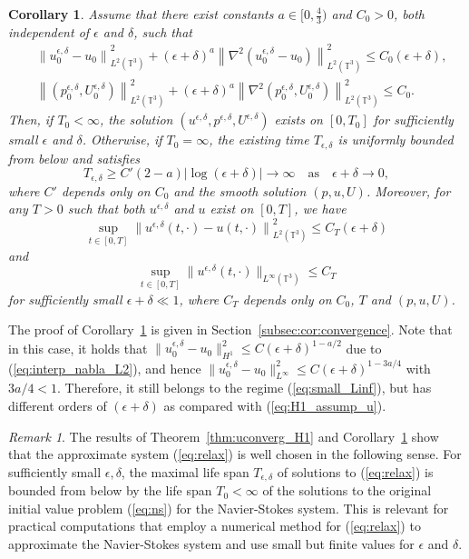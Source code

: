 \documentclass[reqno,10pt]{amsart}
\newtheorem{corollary}[theorem]{Corollary}
\theoremstyle{definition}
\theoremstyle{remark}
\newtheorem{remark}[theorem]{Remark}
\numberwithin{equation}{section}
\begin{document}
\begin{corollary} \label{cor:convergence}    
Assume that there exist constants $a \in [0,\frac{4}{3})$ and $C_0>0$, both independent of $\epsilon$ and $\delta$, such that
    \begin{subequations}
    \begin{align}
        &{\| u_0^{\epsilon,\delta}-u_0\|}_{L^2(\mathbb T^3)}^2 + (\epsilon+\delta)^a \left\|\nabla^2 \left(u_0^{\epsilon,\delta}-u_0\right)\right\|_{L^2(\mathbb T^3)}^2 \le C_0(\epsilon+\delta), \\
        &\left\| \left(p_0^{\epsilon,\delta},U_0^{\epsilon,\delta}\right) \right\|_{L^2(\mathbb T^3)}^2 + (\epsilon+\delta)^a \left\| \nabla^2\left(p_0^{\epsilon,\delta},U_0^{\epsilon,\delta}\right) \right\|_{L^2(\mathbb T^3)}^2 \le C_0.
    \end{align}
    \end{subequations}
    Then, if $T_0<\infty$, the solution $(u^{\epsilon,\delta},p^{\epsilon,\delta},U^{\epsilon,\delta})$ exists on $[0,T_0]$ for sufficiently small $\epsilon$ and $\delta$. Otherwise, if $T_0=\infty$, the existing time $T_{\epsilon,\delta}$ is uniformly bounded from below and satisfies
    \[
        T_{\epsilon,\delta} \ge C' (2-a) |\log(\epsilon+\delta)| \to \infty \quad \text{as} 
        \quad \epsilon+\delta\to 0,
    \]
    where $C'$ depends only on $C_0$ and the smooth solution $(p,u,U)$.
    Moreover, for any $T>0$ such that both $u^{\epsilon,\delta}$ and $u$ exist on $[0,T]$, we have
    \[
        \sup_{t\in[0,T]} {\| u^{\epsilon,\delta}(t,\cdot)-u(t,\cdot)\|}_{L^2(\mathbb T^3)}^2 \le C_T(\epsilon+\delta)
    \]
    and
    \[
       \sup_{t\in[0,T]} \| u^{\epsilon,\delta}(t,\cdot)\|_{L^\infty(\mathbb T^3)} \le C_T  
    \]
    for sufficiently small $\epsilon+\delta \ll 1$, where $C_T$ depends only on $C_0$, $T$ and $(p,u,U)$.
\end{corollary}

The proof of Corollary~\ref{cor:convergence} is given in Section~\ref{subsec:cor:convergence}. Note that in this case, it holds that $\|u^{\epsilon,\delta}_0-u_0\|_{H^1}^2 \le C(\epsilon+\delta)^{1-a/2}$ due to (\ref{eq:interp_nabla_L2}), and hence $\|u^{\epsilon,\delta}_0-u_0\|_{L^\infty}^2 \le C(\epsilon+\delta)^{1-3a/4}$ with $3a/4<1$. Therefore, it still belongs to the regime (\ref{eq:small_Linf}), but has different orders of $(\epsilon+\delta)$ as compared with (\ref{eq:H1_assump_u}).

\begin{remark}
The results of Theorem~\ref{thm:uconverg_H1} and Corollary~\ref{cor:convergence} show that the approximate system (\ref{eq:relax}) is well chosen in the following sense. For sufficiently small $\epsilon,\delta$, the maximal life span $T_{\epsilon,\delta}$ of solutions to (\ref{eq:relax}) is bounded from below by the life span $T_0<\infty$ of the solutions to the original initial value problem (\ref{eq:ns}) for the Navier-Stokes system. This is relevant for practical computations that employ a numerical method  for (\ref{eq:relax}) to approximate the Navier-Stokes system and use small but finite values for $\epsilon$ and $\delta$.
\end{remark}
\end{document}
